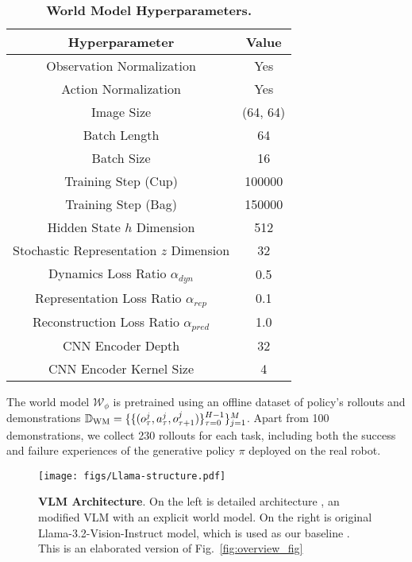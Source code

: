 \begin{table}[ht]
    \centering
    \begin{tabular}{c|c}
        Hyperparameter & Value  \\
        \hline
         Observation Normalization & Yes \\
         Action Normalization & Yes \\
         Image Size & (64, 64) \\
         Batch Length & 64 \\
         Batch Size & 16\\
         Training Step (Cup) & 100000\\
        Training Step (Bag) & 150000\\
        Hidden State $h$ Dimension & 512 \\
        Stochastic Representation $z$ Dimension & 32 \\
        Dynamics Loss Ratio $\alpha_{dyn}$& 0.5 \\
        Representation Loss Ratio $\alpha_{rep}$ & 0.1 \\
        Reconstruction Loss Ratio $\alpha_{pred}$ & 1.0 \\
        CNN Encoder Depth & 32\\
        CNN Encoder Kernel Size & 4\\
        \hline
        
    \end{tabular}
    \caption{\textbf{World Model Hyperparameters.}}
    \label{tab:world_model}
\end{table}
 The world model $\mathcal{W}_\phi$ is pretrained using an offline dataset of policy's rollouts and demonstrations $\mathbb{D}_{\text{WM}} = \{\{ (o_\tau^j, a_\tau^j, o_{\tau+1}^j)\}_{\tau=0}^{H-1}\}_{j=1}^M$. Apart from 100 demonstrations, we collect 230 rollouts for each task, including both the success and failure experiences of the generative policy $\pi$ deployed on the real robot. 
\begin{figure}[ht]
    \centering
    \texttt{[image: figs/Llama-structure.pdf]}
    \caption{\textbf{VLM Architecture}. On the left is detailed architecture \ours, an modified VLM with an explicit world model. On the right is original Llama-3.2-Vision-Instruct model, which is used as our baseline \vlmact. This is an elaborated version of Fig.~\ref{fig:overview_fig}}
    \label{fig:llama_structure}
\end{figure}

